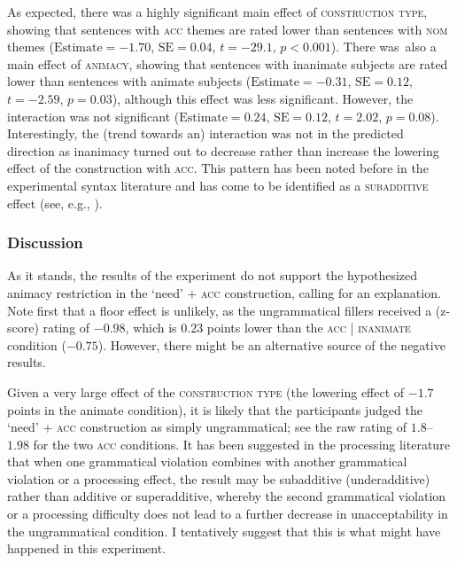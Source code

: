 \documentclass[output=paper,colorlinks,citecolor=brown]{langscibook}
\begin{document}
As expected, there was a highly significant main effect of \textsc{construction type}, showing that sentences with \textsc{acc} themes are rated lower than sentences with \textsc{nom} themes ($\text{Estimate} = -1.70$, $\text{SE} = 0.04$, $t = -29.1$, $p < 0.001$). There was~also a main effect of \textsc{animacy}, showing that sentences with inanimate subjects are rated lower than sentences with animate subjects ($\text{Estimate} = -0.31$, $\text{SE} = 0.12$,  $t = -2.59$, $p = 0.03$), although this effect was less significant. However, the interaction was not significant ($\text{Estimate} = 0.24$, $\text{SE} = 0.12$, $t = 2.02$, $p = 0.08$). Interestingly, the (trend towards an) interaction was not in the predicted direction as inanimacy turned out to decrease rather than increase the lowering effect of the construction with \textsc{acc}. This pattern has been noted before in the experimental syntax literature and has come to be identified as a \textsc{subadditive} effect (see, e.g., \citealt{Stepanov.Music.Stateva2018}).

\subsubsection{Discussion}

As it stands, the results of the experiment do not support the hypothesized animacy restriction in the `need' + \textsc{acc} construction, calling for an explanation. Note first that a floor effect is unlikely, as the ungrammatical fillers received a (z-score) rating of $-0.98$, which is $0.23$ points lower than the \textsc{acc} | \textsc{inanimate} condition ($-0.75$). However, there might be an alternative source of the negative results.

Given a very large effect of the \textsc{construction type} (the lowering effect of $-1.7$ points in the animate condition), it is likely that the participants judged the `need' + \textsc{acc} construction as simply ungrammatical; see the raw rating of $1.8$--$1.98$ for the two \textsc{acc} conditions. It has been suggested in the processing literature \citep[see][]{Hofmeister.Casasanto.Staum.Sag2014} that when one grammatical violation combines with another grammatical violation or a processing effect, the result may be subadditive (underadditive) rather than additive or superadditive, whereby the second grammatical violation or a processing difficulty does not lead to a further decrease in unacceptability in the ungrammatical condition. I tentatively suggest that this is what might have happened in this experiment.
\end{document}
